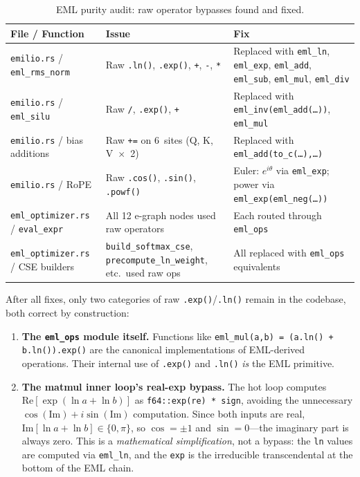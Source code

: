 \documentclass[acmsmall,nonacm]{acmart}
\begin{document}
\begin{table}[h]
\caption{EML purity audit: raw operator bypasses found and fixed.}
\label{tab:audit}
\centering
\small
\begin{tabular}{p{3.2cm}p{3.0cm}p{5.1cm}}
\toprule
\textbf{File / Function} & \textbf{Issue} & \textbf{Fix} \\
\midrule
\texttt{emilio.rs} / \texttt{eml\_rms\_norm}
  & Raw \texttt{.ln()}, \texttt{.exp()}, \texttt{+}, \texttt{-}, \texttt{*}
  & Replaced with \texttt{eml\_ln}, \texttt{eml\_exp}, \texttt{eml\_add}, \texttt{eml\_sub}, \texttt{eml\_mul}, \texttt{eml\_div} \\[3pt]
\texttt{emilio.rs} / \texttt{eml\_silu}
  & Raw \texttt{/}, \texttt{.exp()}, \texttt{+}
  & Replaced with \texttt{eml\_inv(eml\_add(\ldots))}, \texttt{eml\_mul} \\[3pt]
\texttt{emilio.rs} / bias additions
  & Raw \texttt{+=} on 6~sites (Q, K, V~$\times$~2)
  & Replaced with \texttt{eml\_add(to\_c(\ldots),\ldots)} \\[3pt]
\texttt{emilio.rs} / RoPE
  & Raw \texttt{.cos()}, \texttt{.sin()}, \texttt{.powf()}
  & Euler: $e^{i\theta}$ via \texttt{eml\_exp}; power via \texttt{eml\_exp(eml\_neg(\ldots))} \\[3pt]
\texttt{eml\_optimizer.rs} / \texttt{eval\_expr}
  & All 12 e-graph nodes used raw operators
  & Each routed through \texttt{eml\_ops} \\[3pt]
\texttt{eml\_optimizer.rs} / CSE builders
  & \texttt{build\_softmax\_cse}, \texttt{precompute\_ln\_weight}, etc.\ used raw ops
  & All replaced with \texttt{eml\_ops} equivalents \\
\bottomrule
\end{tabular}
\end{table}

After all fixes, only two categories of raw \texttt{.exp()}/\texttt{.ln()}
remain in the codebase, both correct by construction:
\begin{enumerate}
\item \textbf{The \texttt{eml\_ops} module itself.}  Functions like
  \texttt{eml\_mul(a,b) = (a.ln() + b.ln()).exp()} are the canonical
  implementations of EML-derived operations.  Their internal use of
  \texttt{.exp()} and \texttt{.ln()} \emph{is} the EML primitive.
\item \textbf{The matmul inner loop's real-exp bypass.}  The hot loop
  computes $\mathrm{Re}[\exp(\ln a + \ln b)]$ as
  \texttt{f64::exp(re) * sign}, avoiding the unnecessary
  $\cos(\mathrm{Im}) + i\sin(\mathrm{Im})$ computation.  Since both
  inputs are real, $\mathrm{Im}[\ln a + \ln b] \in \{0, \pi\}$, so
  $\cos = \pm1$ and $\sin = 0$---the imaginary part is always zero.
  This is a \emph{mathematical simplification}, not a bypass: the
  \texttt{ln} values are computed via \texttt{eml\_ln}, and the
  \texttt{exp} is the irreducible transcendental at the bottom of the
  EML chain.
\end{enumerate}
\end{document}
